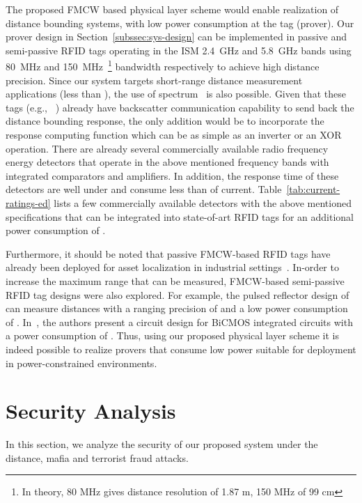 \documentclass{sig-alternate-10pt}
\newcommand{\eg}{e.g.,\xspace}
\begin{document}
The proposed FMCW based physical layer scheme would enable realization of
distance bounding systems, with low power consumption at the tag (prover). Our
prover design in Section~\ref{subssec:sys-design} can be implemented in passive
and semi-passive RFID tags operating in the ISM 2.4~GHz and 5.8~GHz bands using
80~MHz and 150~MHz~\footnote{In theory, 80 MHz gives distance resolution of 1.87
  m, 150 MHz of 99 cm} bandwidth respectively to achieve high distance
precision. Since our system targets short-range distance measurement
applications (less than ), the use of 
spectrum~\cite{hirt2007european} is also possible. Given that these tags (\eg
~\cite{dardari2008passive,d2012uwb,seetharam2007battery}) already have
backscatter communication capability to send back the distance bounding
response, the only addition would be to incorporate the response computing
function which can be as simple as an inverter or an XOR operation. There are
already several commercially available radio frequency energy detectors that
operate in the above mentioned frequency bands with integrated comparators and
amplifiers. In addition, the response time of these detectors are well under
 and consume less than  of current.
Table~\ref{tab:current-ratings-ed} lists a few commercially available detectors
with the above mentioned specifications that can be integrated into state-of-art
RFID tags for an additional power consumption of .

Furthermore, it should be noted that passive FMCW-based RFID tags have already
been deployed for asset localization in industrial settings~\cite{symeo}.
In-order to increase the maximum range that can be measured, FMCW-based
semi-passive RFID tag designs were also explored. For example, the pulsed
reflector design of~\cite{WehrliFeb10} can measure distances with a ranging
precision of  and a low power consumption of .
In~\cite{StrobelSep11}, the authors present a circuit design for BiCMOS
integrated circuits with a power consumption of . Thus, using our
proposed physical layer scheme it is indeed possible to realize provers that
consume low power suitable for deployment in power-constrained environments.

\section{Security Analysis}
\label{sec:security-analysis}

In this section, we analyze the security of our proposed system under the
distance, mafia and terrorist fraud attacks.
\end{document}
